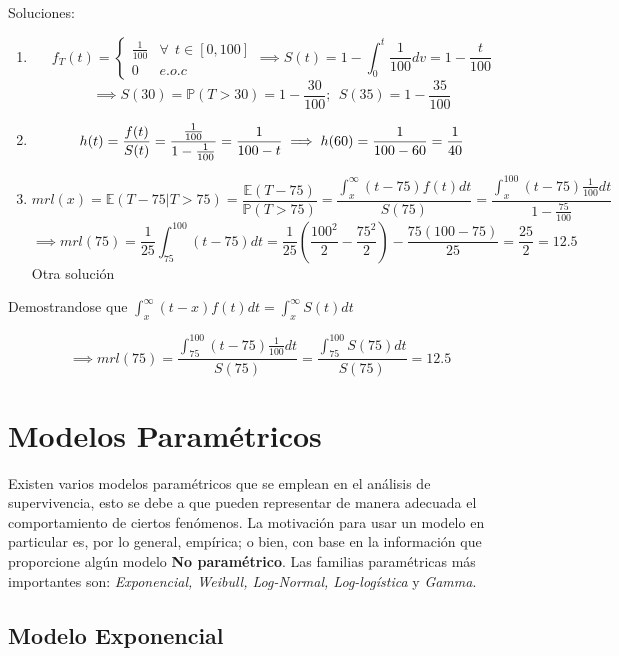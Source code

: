 \documentclass[
  a4paper,
  oneside,
  openany]{book}
\providecommand{\tightlist}{%
  \setlength{\itemsep}{0pt}\setlength{\parskip}{0pt}}
\begin{document}
Soluciones:

\begin{enumerate}
\def\labelenumi{\arabic{enumi}.}
\tightlist
\item
  \[
  f_T(t) = \left\{
  \begin{array}{ll}
  \frac{1}{100} & \forall\ \ t\in [0,100]\\
  0 & e.o.c
  \end{array}
  \right.
  \implies S(t) = 1-\int_0^t\frac{1}{100}dv = 1-\frac{t}{100}
  \]
  \[
  \implies S(30) = \mathbb{P}(T>30) = 1-\frac{30}{100};\ \  S(35) = 1- \frac{35}{100}
  \]
\item
  \[
  h(t) = \frac{f(t)}{S(t)} = \frac{\frac{1}{100}}{1-\frac{1}{100}} = \frac{1}{100-t}\\
  \implies h(60) = \frac{1}{100-60} = \frac{1}{40}
  \]
\item
  \[
  mrl(x) = \mathbb{E}(T-75 | T>75) = \frac{\mathbb{E}(T-75)}{\mathbb{P}(T>75)} = \frac{\int_x^\infty(t-75)f(t)dt}{S(75)} = \frac{\int_x^{100}(t-75)\frac{1}{100}dt}{1-\frac{75}{100}}
  \]
  \[
  \implies mrl(75) = \frac{1}{25}\int_{75}^{100}(t-75)dt = \frac{1}{25}\left(\frac{100^2}{2}-\frac{75^2}{2}\right)-\frac{75(100-75)}{25} = \frac{25}{2} = 12.5
  \]
  Otra solución
\end{enumerate}

Demostrandose que \(\int_x^\infty(t-x)f(t) dt = \int_x^\infty S(t)dt\)

\[
\implies mrl(75) = \frac{\int_{75}^{100}(t-75)\frac{1}{100}dt}{S(75)} = \frac{\int_{75}^{100}S(75)dt}{S(75)} = 12.5
\]

\hypertarget{modelos-paramuxe9tricos}{%
\chapter{Modelos Paramétricos}\label{modelos-paramuxe9tricos}}

Existen varios modelos paramétricos que se emplean en el análisis de supervivencia, esto se debe a que pueden representar de manera adecuada el comportamiento de ciertos fenómenos. La motivación para usar un modelo en particular es, por lo general, empírica; o bien, con base en la información que proporcione algún modelo \textbf{No paramétrico}. Las familias paramétricas más importantes son: \emph{Exponencial, Weibull, Log-Normal, Log-logística} y \emph{Gamma}.

\hypertarget{modelo-exponencial}{%
\section{Modelo Exponencial}\label{modelo-exponencial}}
\end{document}
